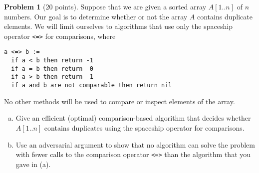 \documentclass{article}
\theoremstyle{definition}
\newtheorem{problem}{Problem}
\begin{document}
\newpage
\begin{problem}[20 points]
Suppose that we are given a sorted array $A[1..n]$ of $n$ numbers. Our
goal is to determine whether or not the array $A$ contains
duplicate elements. We will limit ourselves to algorithms that use only the spaceship
operator \verb|<=>| for comparisons, where 
\begin{verbatim}
a <=> b :=
  if a < b then return -1
  if a = b then return  0
  if a > b then return  1
  if a and b are not comparable then return nil
\end{verbatim}
No other methods will be used to compare or inspect elements of the
array. 
\begin{enumerate}[(a)]
\item Give an efficient (optimal) comparison-based algorithm that decides
  whether $A[1..n]$ contains duplicates using the spaceship operator
  for comparisons. 
\item Use an adversarial argument to show that no algorithm can solve
  the problem with fewer calls to the comparison operator \verb|<=>|
  than the algorithm that you gave in (a). 
\end{enumerate}
\end{problem}
\end{document}
